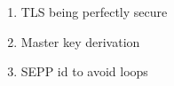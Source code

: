 \begin{enumerate}
    \item TLS being perfectly secure
    \item Master key derivation
    \item SEPP id to avoid loops
\end{enumerate}